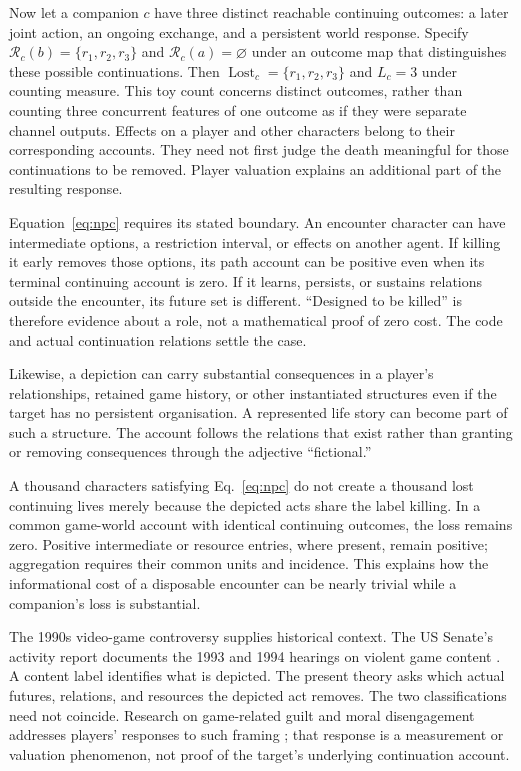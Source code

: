 \documentclass[11pt,a4paper]{article}
\theoremstyle{remark}
\newcommand{\R}{\mathcal R}
\newcommand{\Lost}{\operatorname{Lost}}
\begin{document}
Now let a companion $c$ have three distinct reachable continuing outcomes: a
later joint action, an ongoing exchange, and a persistent world response.
Specify $\R_c(b)=\{r_1,r_2,r_3\}$ and $\R_c(a)=\varnothing$ under an outcome
map that distinguishes these possible continuations. Then
$\Lost_c=\{r_1,r_2,r_3\}$ and $L_c=3$ under counting measure. This toy count
concerns distinct outcomes, rather than counting three concurrent features of
one outcome as if they were separate channel outputs.
Effects on a player and other characters belong to their corresponding accounts.
They need not first judge the death meaningful for those continuations to be
removed. Player valuation explains an additional part of the resulting response.

Equation~\eqref{eq:npc} requires its stated boundary. An encounter character can
have intermediate options, a restriction interval, or effects on another agent.
If killing it early removes those options, its path account can be positive even
when its terminal continuing account is zero. If it learns, persists, or sustains
relations outside the encounter, its future set is different. ``Designed to be
killed'' is therefore evidence about a role, not a mathematical proof of zero
cost. The code and actual continuation relations settle the case.

Likewise, a depiction can carry substantial consequences in a player's
relationships, retained game history, or other instantiated structures even if
the target has no persistent organisation. A represented life story can become
part of such a structure. The account follows the relations that exist rather
than granting or removing consequences through the adjective ``fictional.''

A thousand characters satisfying Eq.~\eqref{eq:npc} do not create a thousand
lost continuing lives merely because the depicted acts share the label killing.
In a common game-world account with identical continuing outcomes, the loss
remains zero. Positive intermediate or resource entries, where present, remain
positive; aggregation requires their common units and incidence. This explains
how the informational cost of a disposable encounter can be nearly trivial while a
companion's loss is substantial.

The 1990s video-game controversy supplies historical context. The US Senate's
activity report documents the 1993 and 1994 hearings on violent game content
\citep{senate1995activities}. A content label identifies what is depicted. The
present theory asks which actual futures, relations, and resources the depicted
act removes. The two classifications need not coincide. Research on game-related
guilt and moral disengagement addresses players' responses to such framing
\citep{hartmannvorderer2010disengagement}; that response is a measurement or
valuation phenomenon, not proof of the target's underlying continuation account.
\end{document}
